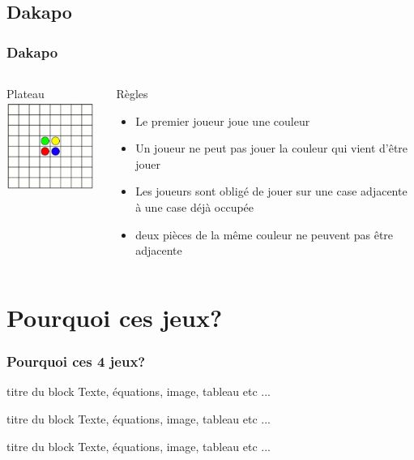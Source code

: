 \documentclass[11pt]{beamer}
\begin{document}
\subsection[Dakapo]{Dakapo}
\begin{frame}
\frametitle{Dakapo}
\subtitle{Dakapo}
\begin{columns}[t]
    \begin{column}{3cm}
        \begin{block}{Plateau}
            \centering \includegraphics[width=80pt]{images/daka.JPG}
        \end{block}
    \end{column}
    
    \begin{column}{7cm}
        \begin{block}{Règles}
            \begin{itemize}
                \item Le premier joueur joue une couleur
                \item Un joueur ne peut pas jouer la couleur qui vient d'être jouer
                \item Les joueurs sont obligé de jouer sur une case adjacente à une case déjà occupée
                \item deux pièces de la même couleur ne peuvent pas être adjacente
                
                
            \end{itemize}
        \end{block}
    \end{column}
\end{columns}

\end{frame}

\section{Pourquoi ces jeux?}  
  \begin{frame}
  \frametitle{Pourquoi ces 4 jeux?}

\begin{block}{ titre du block }
      Texte, équations, image, tableau etc ...
\end{block}

\begin{block}{ titre du block }
      Texte, équations, image, tableau etc ...
\end{block}

\begin{block}{ titre du block }
      Texte, équations, image, tableau etc ...
\end{block}
			
  \end{frame}
    
\end{document}
